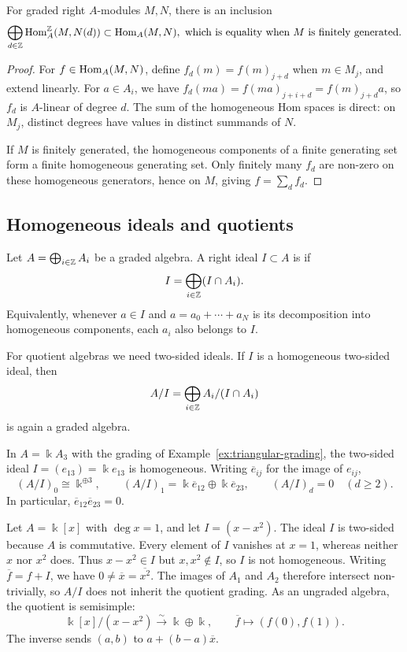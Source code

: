 \begin{lemma}\label{lem:homogeneous-hom-sum}
For graded right $A$-modules $M,N$, there is an inclusion 
\[
\bigoplus_{d\in\mathbb{Z}}\operatorname{Hom}\nolimits_A^{\mathbb{Z}}(M,N(d))\subset\operatorname{Hom}\nolimits_A(M,N), \text{ which is equality when $M$ is finitely generated.}
\]
\end{lemma}

\begin{proof}
For $f\in\operatorname{Hom}\nolimits_A(M,N)$, define $f_d(m)=f(m)_{j+d}$ when $m\in M_j$, and extend linearly.
For $a\in A_i$, we have $f_d(ma)=f(ma)_{j+i+d}=f(m)_{j+d}a$, so $f_d$ is $A$-linear of degree $d$.
The sum of the homogeneous Hom spaces is direct: on $M_j$, distinct degrees have values in distinct summands of $N$.

If $M$ is finitely generated, the homogeneous components of a finite generating set form a finite homogeneous generating set.
Only finitely many $f_d$ are non-zero on these homogeneous generators, hence on $M$, giving $f=\sum_d f_d$.
\end{proof}

\subsection{Homogeneous ideals and quotients}

\begin{definition}
Let $A=\bigoplus_{i\in\mathbb{Z}}A_i$ be a graded algebra.
A right ideal $I\subset A$ is  if
\[
I=\bigoplus_{i\in\mathbb{Z}}(I\cap A_i).
\]
Equivalently, whenever $a\in I$ and $a=a_0+\cdots+a_N$ is its decomposition into homogeneous components, each $a_i$ also belongs to $I$.
\end{definition}

For quotient algebras we need two-sided ideals.
If $I$ is a homogeneous two-sided ideal, then
\[
A/I=\bigoplus_{i\in\mathbb{Z}} A_i/(I\cap A_i)
\]
is again a graded algebra.

\begin{example}\label{ex:quadratic-matrix-quotient}
In $A=\Bbbk A_3$ with the grading of Example~\ref{ex:triangular-grading}, the two-sided ideal $I=(e_{13})=\Bbbk e_{13}$ is homogeneous.
Writing $\overline e_{ij}$ for the image of $e_{ij}$,
\[
(A/I)_0\cong\Bbbk^{\oplus 3},\qquad
(A/I)_1=\Bbbk\overline e_{12}\oplus\Bbbk\overline e_{23},\qquad
(A/I)_d=0\quad(d\geq 2).
\]
In particular, $\overline e_{12}\overline e_{23}=0$.
\end{example}

\begin{example}\label{ex:nonhomogeneous-ideal}
Let $A=\Bbbk[x]$ with $\deg x=1$, and let $I=(x-x^2)$.
The ideal $I$ is two-sided because $A$ is commutative.
Every element of $I$ vanishes at $x=1$, whereas neither $x$ nor $x^2$ does.
Thus $x-x^2\in I$ but $x,x^2\notin I$, so $I$ is not homogeneous.
Writing $\overline f=f+I$, we have $0\neq\overline x=\overline{x^2}$.
The images of $A_1$ and $A_2$ therefore intersect non-trivially, so $A/I$ does not inherit the quotient grading.
As an ungraded algebra, the quotient is semisimple:
\[
\Bbbk[x]/(x-x^2)\xrightarrow{\sim}\Bbbk\oplus\Bbbk,
\qquad \overline f\longmapsto(f(0),f(1)).
\]
The inverse sends $(a,b)$ to $a+(b-a)\overline x$.
\end{example}

